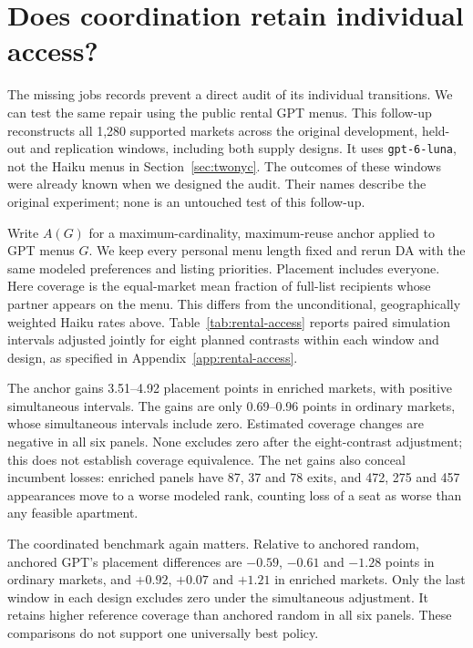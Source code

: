 \section{Does coordination retain individual access?}\label{sec:rental-access}
The missing jobs records prevent a direct audit of its individual transitions.
We can test the same repair using the public rental GPT menus. This follow-up
reconstructs all 1,280 supported markets across the original development,
held-out and replication windows, including both supply designs. It uses
\texttt{gpt-6-luna}, not the Haiku menus in Section~\ref{sec:twonyc}.
The outcomes of these windows were already known when we designed the audit.
Their names describe the original experiment; none is an untouched test of
this follow-up.

Write $A(G)$ for a maximum-cardinality, maximum-reuse anchor applied to GPT
menus $G$. We keep every personal menu length fixed and rerun DA with the
same modeled preferences and listing priorities. Placement includes everyone.
Here coverage is the equal-market mean fraction of full-list recipients whose
partner appears on the menu. This differs from the unconditional, geographically
weighted Haiku rates above. Table~\ref{tab:rental-access} reports paired
simulation intervals adjusted jointly for eight planned contrasts within
each window and design, as specified in Appendix~\ref{app:rental-access}.

\begin{table}[ht]\centering\small
\caption{Rental GPT follow-up: $A(G)-G$, in percentage points, with 95\%
simultaneous seed-bootstrap intervals. Exits are actual replay transition
counts, not losses observed in the housing market. Appearances can repeat
households across draws.}\label{tab:rental-access}

\end{table}

The anchor gains 3.51--4.92 placement points in enriched markets, with
positive simultaneous intervals. The gains are only 0.69--0.96 points in
ordinary markets, whose simultaneous intervals include zero. Estimated
coverage changes are negative in all six panels. None excludes zero after
the eight-contrast adjustment; this does not establish coverage equivalence.
The net gains also conceal incumbent losses: enriched panels have 87, 37 and
78 exits, and 472, 275 and 457 appearances move to a worse modeled rank,
counting loss of a seat as worse than any feasible apartment.

The coordinated benchmark again matters. Relative to anchored random,
anchored GPT's placement differences are $-0.59$, $-0.61$ and $-1.28$ points
in ordinary markets, and $+0.92$, $+0.07$ and $+1.21$ in enriched markets.
Only the last window in each design excludes zero under the simultaneous
adjustment. It retains higher reference coverage than anchored random in
all six panels. These comparisons do not support one universally best policy.

